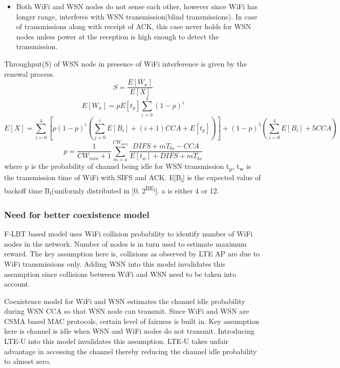 \documentclass[a4paper]{article}
\begin{document}
\begin{itemize}
\item Both {WiFi} and  {WSN} nodes do not sense each other, however since {WiFi} has longer range, interferes with {WSN} transmission(blind transmissions).
In case of transmissions along with receipt of ACK, this case never holds for {WSN} nodes unless power at the reception is high enough to detect the transmission.

\end{itemize}

Throughput(S) of {WSN} node in presence of {WiFi} interference is given by the renewal process.
\begin{equation}
					S =  \frac{E[W_n]}{E[X]}
\end{equation}
\begin{equation}
					E[W_n] = pE[t_p]\sum_{i=0}^{4}{(1-p)}^i
\end{equation}
\begin{equation}
					E[X] = \sum_{i=0}^4[p{(1-p)}^i(\sum_{j=0}^iE[B_i] + (i + 1)CCA + E[t_p])] + (1-p)^5(\sum_{i=0}^4E[B_i] + 5CCA)
\end{equation}
\begin{equation}
					p = \frac{1}{CW_{min} + 1} \sum_{m=a}^{CW_{min}} \frac{DIFS + mT_{bs} - CCA}{E[t_w] + DIFS + mT_{bs}}
\end{equation}
where p is the probability of channel being idle for {WSN} transmission t\textsubscript{p}, t\textsubscript{w} is the transmission time of {WiFi} with SIFS and ACK. E[B\textsubscript{i}] is the expected value of backoff time B\textsubscript{i}(uniformly distributed in [0, 2\textsuperscript{BE\textsubscript{i}}]. a is either 4 or 12.

\subsubsection{Need for better coexistence model}
{F-LBT} based model uses {WiFi} collision probability to identify number of {WiFi} nodes in the network. Number of nodes is in turn used to estimate maximum reward. The key assumption here is, collisions as observed by {LTE AP} are due to {WiFi} transmissions only. Adding {WSN} into this model invalidates this assumption since collisions between {WiFi} and {WSN} need to be taken into account. 

Coexistence model for {WiFi} and {WSN} estimates the channel idle probability during {WSN} CCA so that {WSN} node can transmit. Since {WiFi} and {WSN} are {CSMA} based {MAC} protocols, certain level of fairness is built in. Key assumption here is channel is idle when {WSN} and {WiFi} nodes do not transmit. Introducing {LTE-U} into this model invalidates this assumption. {LTE-U} takes unfair advantage in accessing the channel thereby reducing the channel idle probability to almost zero.
\end{document}
